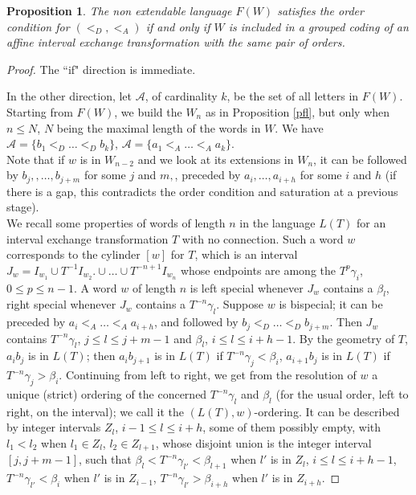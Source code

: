 \documentclass[12pt,a4paper]{amsart}
\newtheorem{proposition}[theorem]{Proposition}
\begin{document}
\begin{proposition}\label{pfl2}
The non extendable language $F(W)$ satisfies the order condition for  $(<_D,<_A)$ if and only if $W$ is included in a grouped coding of
an affine interval exchange transformation with the same pair of  orders.\end{proposition}
\begin{proof}
The ``if" direction is immediate. 

In the other direction, let $\mathcal A$, of cardinality $k$, be the set of all letters in  $F(W).$ Starting from $F(W)$, we build the $W_n$ as in Proposition \ref{pfl}, but only   when $n\leq N$, $N$ being  the maximal length of the words in $W$.  We have  $\mathcal A=\{b_1<_D\ldots <_D b_k\}$,  $\mathcal A=\{a_1<_A\ldots <_A a_k\}$. \\
 Note that if $w$ is in $W_{n-2}$  and we look at its extensions in $W_n$, it can be followed by $b_j,,\ldots ,b_{j+m}$ for some $j$ and $m,$, preceded by $a_i, \ldots ,a_{i+h}$ for some $i$ and $h$ (if there is a gap, this contradicts the order condition and saturation at a  previous stage). \\


We recall  some properties of words of length $n$ in the language $L(T)$ for an interval exchange transformation $T$ with no connection. Such a word $w$ corresponds to  the cylinder $[w]$ for $T$, which is an interval $J_w=I_{w_1}\cup T^{-1}I_{w_2}.\cup \ldots \cup T^{-n+1}I_{w_n}$ whose endpoints are among the $T^p\gamma_i$, $0\leq p\leq n-1$.   
A word $w$ of  length $n$ is left 
special whenever $J_w$ contains a $\beta_l$, right special whenever $J_w$ contains a $T^{-n}\gamma_l$. Suppose  $w$ is bispecial; it can be preceded by $a_i<_A\ldots <_A a_{i+h}$, and followed by $b_j<_D\ldots <_D b_{j+m}$. Then $J_w$ contains $T^{-n}\gamma_l$, $j \leq l\leq j+m-1$
and $\beta_l$, $i \leq l\leq i+h-1$. By the geometry of $T$, $a_ib_j$ is in $L(T)$; then $a_ib_{j+1}$ is in $L(T)$ if $T^{-n}\gamma_j<\beta_i$, $a_{i+1}b_j$ is in $L(T)$ if $T^{-n}\gamma_j>\beta_i$. Continuing from left to right, we get from the resolution of $w$ a unique (strict) ordering
 of the concerned $T^{-n}\gamma_l$ and $\beta_l$ (for the usual order, left to right, on the interval); we call it the $(L(T), w)$-ordering. It can be described by integer intervals $Z_l$, $i-1\leq l\leq i+h$, some of them possibly empty, with $l_1<l_2$ when $l_1\in Z_l$, $l_2\in Z_{l+1}$,
 whose disjoint union is the integer interval $[j,j+m-1]$, such  that $\beta_l<T^{-n}\gamma_{l'}< \beta_{l+1}$ when $l'$ is in $Z_l$, $i \leq l\leq i+h-1$, $T^{-n}\gamma_{l'}< \beta_{i}$ when $l'$ is in $Z_{i-1}$, $T^{-n}\gamma_{l'}> \beta_{i+h}$ when $l'$ is in $Z_{i+h}$.
 

\end{proof}
\end{document}
